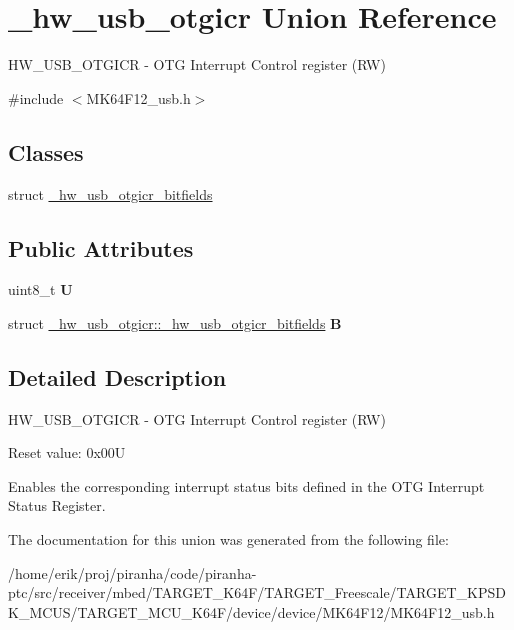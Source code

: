 \hypertarget{union__hw__usb__otgicr}{}\section{\+\_\+hw\+\_\+usb\+\_\+otgicr Union Reference}
\label{union__hw__usb__otgicr}


H\+W\+\_\+\+U\+S\+B\+\_\+\+O\+T\+G\+I\+CR -\/ O\+TG Interrupt Control register (RW)  




{\ttfamily \#include $<$M\+K64\+F12\+\_\+usb.\+h$>$}

\subsection*{Classes}
\begin{DoxyCompactItemize}
\item 
struct \hyperlink{struct__hw__usb__otgicr_1_1__hw__usb__otgicr__bitfields}{\+\_\+hw\+\_\+usb\+\_\+otgicr\+\_\+bitfields}
\end{DoxyCompactItemize}
\subsection*{Public Attributes}
\begin{DoxyCompactItemize}
\item 
uint8\+\_\+t {\bfseries U}\hypertarget{union__hw__usb__otgicr_a82ccab367eb89dbcc3b4279682352f66}{}\label{union__hw__usb__otgicr_a82ccab367eb89dbcc3b4279682352f66}

\item 
struct \hyperlink{struct__hw__usb__otgicr_1_1__hw__usb__otgicr__bitfields}{\+\_\+hw\+\_\+usb\+\_\+otgicr\+::\+\_\+hw\+\_\+usb\+\_\+otgicr\+\_\+bitfields} {\bfseries B}\hypertarget{union__hw__usb__otgicr_aaff4628d6c51edfede6bfbb7146afde2}{}\label{union__hw__usb__otgicr_aaff4628d6c51edfede6bfbb7146afde2}

\end{DoxyCompactItemize}


\subsection{Detailed Description}
H\+W\+\_\+\+U\+S\+B\+\_\+\+O\+T\+G\+I\+CR -\/ O\+TG Interrupt Control register (RW) 

Reset value\+: 0x00U

Enables the corresponding interrupt status bits defined in the O\+TG Interrupt Status Register. 

The documentation for this union was generated from the following file\+:\begin{DoxyCompactItemize}
\item 
/home/erik/proj/piranha/code/piranha-\/ptc/src/receiver/mbed/\+T\+A\+R\+G\+E\+T\+\_\+\+K64\+F/\+T\+A\+R\+G\+E\+T\+\_\+\+Freescale/\+T\+A\+R\+G\+E\+T\+\_\+\+K\+P\+S\+D\+K\+\_\+\+M\+C\+U\+S/\+T\+A\+R\+G\+E\+T\+\_\+\+M\+C\+U\+\_\+\+K64\+F/device/device/\+M\+K64\+F12/M\+K64\+F12\+\_\+usb.\+h\end{DoxyCompactItemize}
